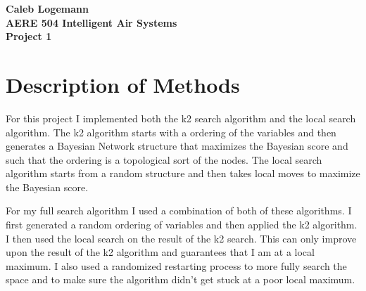 \documentclass[12pt, oneside]{article}
\begin{document}
\noindent \textbf{\Large{Caleb Logemann \\
AERE 504 Intelligent Air Systems \\
Project 1
}}

\section{Description of Methods}
  For this project I implemented both the k2 search algorithm and the local
  search algorithm.
  The k2 algorithm starts with a ordering of the variables and then generates
  a Bayesian Network structure that maximizes the Bayesian score and such that
  the ordering is a topological sort of the nodes.
  The local search algorithm starts from a random structure and then takes
  local moves to maximize the Bayesian score.

  For my full search algorithm I used a combination of both of these algorithms.
  I first generated a random ordering of variables and then applied the k2 algorithm.
  I then used the local search on the result of the k2 search.
  This can only improve upon the result of the k2 algorithm and guarantees that
  I am at a local maximum.
  I also used a randomized restarting process to more fully search the space
  and to make sure the algorithm didn't get stuck at a poor local maximum.
\end{document}
